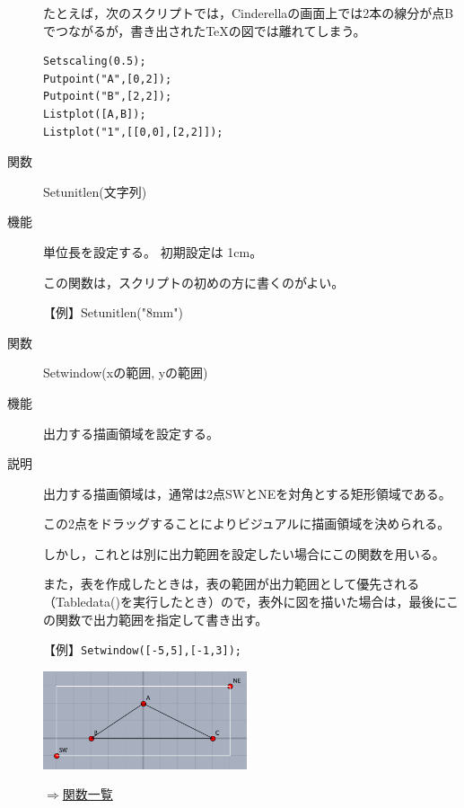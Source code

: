 \documentclass[papersize,a4paper,12pt,uplatex]{jsarticle}
\begin{document}
\begin{description}
たとえば，次のスクリプトでは，Cinderellaの画面上では2本の線分が点Bでつながるが，書き出された\TeX の図では離れてしまう。
\begin{verbatim}
Setscaling(0.5);
Putpoint("A",[0,2]);
Putpoint("B",[2,2]);
Listplot([A,B]);
Listplot("1",[[0,0],[2,2]]);
\end{verbatim}

\vspace{\baselineskip}
\hypertarget{setunitlen}{}
\item[関数]Setunitlen(文字列)
\item[機能]単位長を設定する。 初期設定は 1cm。

この関数は，スクリプトの初めの方に書くのがよい。

【例】Setunitlen("8mm")

\vspace{\baselineskip}
\hypertarget{setwindow}{}
\item[関数]Setwindow(xの範囲, yの範囲)
\item[機能]出力する描画領域を設定する。
\item[説明]出力する描画領域は，通常は2点SWとNEを対角とする矩形領域である。

この2点をドラッグすることによりビジュアルに描画領域を決められる。

しかし，これとは別に出力範囲を設定したい場合にこの関数を用いる。

また，表を作成したときは，表の範囲が出力範囲として優先される（Tabledata()を実行したとき）ので，表外に図を描いた場合は，最後にこの関数で出力範囲を指定して書き出す。

\vspace{\baselineskip}
【例】\verb|Setwindow([-5,5],[-1,3]);|

\vspace{\baselineskip}
\hspace{10mm}\includegraphics[bb=0.00 0.00 415.02 199.01,width=6cm]{Fig/setwindow.pdf} 

\begin{flushright}\hyperlink{functionlist}{$\Rightarrow$関数一覧}\end{flushright}

\end{description}
\end{document}
